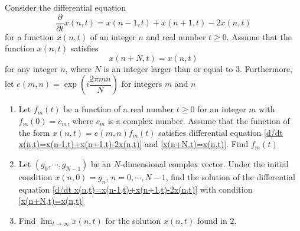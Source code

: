 \documentclass[main]{subfiles}
\begin{document}
\begin{exercise}
Consider the differential equation
\begin{equation}\label{d/dt x(n,t)=x(n-1,t)+x(n+1,t)-2x(n,t)}
\frac{\partial}{\partial t}x(n,t)=x(n-1,t)+x(n+1,t)-2x(n,t)
\end{equation}
for a function $x(n,t)$ of an integer $n$ and real number $t\geq0$. Assume that the function $x(n,t)$ satisfies
\begin{equation}\label{x(n+N,t)=x(n,t)}
x(n+N,t)=x(n,t)
\end{equation}
for any integer $n$, where $N$ is an integer larger than or equal to $3$. Furthermore, let $e(m,n)=\exp\left(i\dfrac{2\pi mn}{N}\right)$ for integers $m$ and $n$
\begin{enumerate}[leftmargin=*,label=\textbf{\arabic*.}]
\item Let $f_m(t)$ be a function of a real number $t\geq0$ for an integer $m$ with $f_m(0)=c_m$, where $c_m$ is a complex number. Assume that the function of the form $x(n,t)=e(m,n)f_m(t)$ satisfies differential equation \eqref{d/dt x(n,t)=x(n-1,t)+x(n+1,t)-2x(n,t)} and \eqref{x(n+N,t)=x(n,t)}. Find $f_m(t)$
\item Let $(g_0,\cdots, g_{N-1})$ be an $N$-dimensional complex vector. Under the initial condition $x(n,0)=g_n$, $n=0,\cdots,N-1$, find the solution of the differential equation \eqref{d/dt x(n,t)=x(n-1,t)+x(n+1,t)-2x(n,t)} with condition \eqref{x(n+N,t)=x(n,t)}
\item Find $\displaystyle\lim_{t\to\infty}x(n,t)$ for the solution $x(n,t)$ found in $2.$
\end{enumerate}
\end{exercise}
\end{document}
